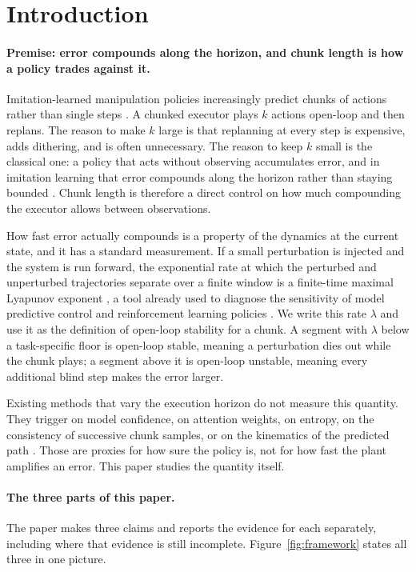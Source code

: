 \section{Introduction}

\paragraph{Premise: error compounds along the horizon, and chunk length is how
a policy trades against it.}
Imitation-learned manipulation policies increasingly predict chunks of actions
rather than single steps \citep{zhao2023act,chi2023diffusion}. A chunked
executor plays $k$ actions open-loop and then replans. The reason to make $k$
large is that replanning at every step is expensive, adds dithering, and is
often unnecessary. The reason to keep $k$ small is the classical one: a policy
that acts without observing accumulates error, and in imitation learning that
error compounds along the horizon rather than staying bounded
\citep{ross2010efficient,ross2011dagger}. Chunk length is therefore a direct
control on how much compounding the executor allows between observations.

How fast error actually compounds is a property of the dynamics at the current
state, and it has a standard measurement. If a small perturbation is injected
and the system is run forward, the exponential rate at which the perturbed and
unperturbed trajectories separate over a finite window is a finite-time
maximal Lyapunov exponent \citep{haller2015lcs}, a tool already used to
diagnose the sensitivity of model predictive control and reinforcement
learning policies \citep{krishna2023ftle}. We write this rate $\lambda$ and use
it as the definition of open-loop stability for a chunk. A segment with
$\lambda$ below a task-specific floor is open-loop stable, meaning a
perturbation dies out while the chunk plays; a segment above it is open-loop
unstable, meaning every additional blind step makes the error larger.

Existing methods that vary the execution horizon do not measure this quantity.
They trigger on model confidence, on attention weights, on entropy, on the
consistency of successive chunk samples, or on the kinematics of the predicted
path \citep{zhao2026dehp,wang2026autohorizon,nie2026pace,zhang2026hipolicy,feng2026dvac,so2025sgac}.
Those are proxies for how sure the policy is, not for how fast the plant
amplifies an error. This paper studies the quantity itself.

\paragraph{The three parts of this paper.}
The paper makes three claims and reports the evidence for each separately,
including where that evidence is still incomplete.
Figure~\ref{fig:framework} states all three in one picture.

